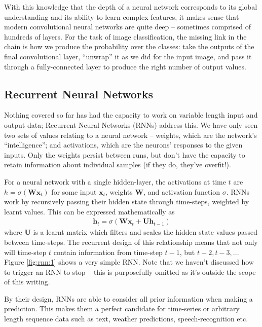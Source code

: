 \documentclass{report}
\begin{document}
With this knowledge that the depth of a neural network corresponds to its global understanding and its ability to learn complex features, it makes sense that modern convolutional neural networks are quite deep -- sometimes comprised of hundreds of layers. For the task of image classification, the missing link in the chain is how we produce the probability over the classes: take the outputs of the final convolutional layer, ``unwrap'' it as we did for the input image, and pass it through a fully-connected layer to produce the right number of output values. \par

\subsection{Recurrent Neural Networks}\label{rnn:1}
Nothing covered so far has had the capacity to work on variable length input and output data; Recurrent Neural Networks (RNNs) address this. We have only seen two sets of values relating to a neural network -- weights, which are the network's ``intelligence''; and activations, which are the neurons' responses to the given inputs. Only the weights persist between runs, but don't have the capacity to retain information about individual samples (if they do, they've overfit!). \par
For a neural network with a single hidden-layer, the activations at time $t$ are $h = \sigma(\bm{W}\bm{x}_t)$ for some input $\bm{x}_t$, weights $\bm{W}$, and activation function $\sigma$. RNNs work by recursively passing their hidden state through time-steps, weighted by learnt values. This can be expressed mathematically as
\begin{align}
 \bm{h}_{t} = \sigma(\bm{W}\bm{x}_t + \bm{U}\bm{h}_{t-1})
\end{align}
where $\bm{U}$ is a learnt matrix which filters and scales the hidden state values passed between time-steps. The recurrent design of this relationship means that not only will time-step $t$ contain information from time-step $t-1$, but $t-2, t-3, ...$ Figure \ref{fig:rnn:1} shows a very simple RNN. Note that we haven't discussed how to trigger an RNN to stop -- this is purposefully omitted as it's outside the scope of this writing. \par
By their design, RNNs are able to consider all prior information when making a prediction. This makes them a perfect candidate for time-series or arbitrary length sequence data such as text, weather predictions, speech-recognition etc.
\end{document}
